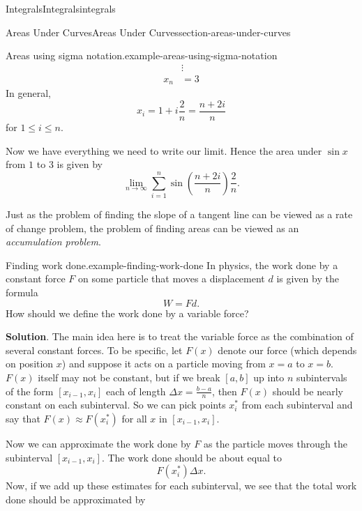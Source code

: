 \documentclass[oneside,10pt,]{book}
\numberwithin{equation}{section}
\begin{document}
\begin{chapterptx}{Integrals}{}{Integrals}{}{}{integrals}
\begin{sectionptx}{Areas Under Curves}{}{Areas Under Curves}{}{}{section-areas-under-curves}
\begin{example}{Areas using sigma notation.}{example-areas-using-sigma-notation}
\begin{align*}
& \vdots \\
x_{n} & = 3 
\end{align*}
In general,%
\begin{equation*}
x_{i} = 1 + i\frac{2}{n} = \frac{n+2i}{n}
\end{equation*}
for \(1\leq i\leq n\).%
\par
\hypertarget{p-419}{}%
Now we have everything we need to write our limit. Hence the area under \(\sin x\) from \(1\) to \(3\) is given by%
\begin{equation*}
\lim_{n\to\infty}\sum_{i=1}^{n}\sin\left(\frac{n+2i}{n}\right)\frac{2}{n}.
\end{equation*}
%
\end{example}
\hypertarget{p-420}{}%
Just as the problem of finding the slope of a tangent line can be viewed as a rate of change problem, the problem of finding areas can be viewed as an \emph{accumulation problem}.%
\begin{example}{Finding work done.}{example-finding-work-done}%
\hypertarget{p-421}{}%
In physics, the work done by a constant force \(F\) on some particle that moves a displacement \(d\) is given by the formula%
\begin{equation*}
W = Fd.
\end{equation*}
How should we define the work done by a variable force?%
\par\smallskip%
\noindent\textbf{Solution}.\hypertarget{solution-93}{}\quad%
\hypertarget{p-422}{}%
The main idea here is to treat the variable force as the combination of several constant forces. To be specific, let \(F(x)\) denote our force (which depends on position \(x\)) and suppose it acts on a particle moving from \(x=a\) to \(x=b\). \(F(x)\) itself may not be constant, but if we break \([a,b]\) up into \(n\) subintervals of the form \([x_{i-1},x_{i}]\) each of length \(\Delta x = \frac{b-a}{n}\), then \(F(x)\) should be nearly constant on each subinterval. So we can pick points \(x_{i}^{*}\) from each subinterval and say that \(F(x)\approx F(x_{i}^{*})\) for all \(x\) in \([x_{i-1},x_{i}]\).%
\par
\hypertarget{p-423}{}%
Now we can approximate the work done by \(F\) as the particle moves through the subinterval \([x_{i-1},x_{i}]\). The work done should be about equal to%
\begin{equation*}
F(x_{i}^{*})\Delta x\text{.}
\end{equation*}
Now, if we add up these estimates for each subinterval, we see that the total work done should be approximated by%

\end{example}
\end{sectionptx}
\end{chapterptx}
\end{document}
